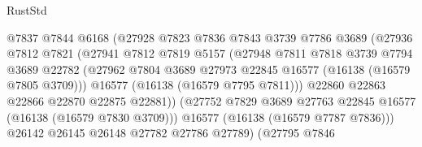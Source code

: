 \begin{lexlean}{RustStd}
\begin{coremodule}
                                  @7837
                                  @7844
                                  @6168
                                  (@27928
                                    @7823
                                    @7836
                                    @7843
                                    @3739
                                    @7786
                                    @3689
                                    (@27936
                                      @7812
                                      @7821
                                      (@27941
                                        @7812
                                        @7819
                                        @5157
                                        (@27948
                                          @7811
                                          @7818
                                          @3739
                                          @7794
                                          @3689
                                          @22782
                                          (@27962
                                            @7804
                                            @3689
                                            @27973
                                            @22845
                                            @16577
                                            (@16138 (@16579 @7805 @3709)))
                                          @16577
                                          (@16138 (@16579 @7795 @7811)))
                                        @22860
                                        @22863
                                        @22866
                                        @22870
                                        @22875
                                        @22881))
                                    (@27752
                                      @7829
                                      @3689
                                      @27763
                                      @22845
                                      @16577
                                      (@16138 (@16579 @7830 @3709)))
                                    @16577
                                    (@16138 (@16579 @7787 @7836)))
                                  @26142
                                  @26145
                                  @26148
                                  @27782
                                  @27786
                                  @27789)
                                (@27795
                                  @7846

\end{coremodule}
\end{lexlean}
